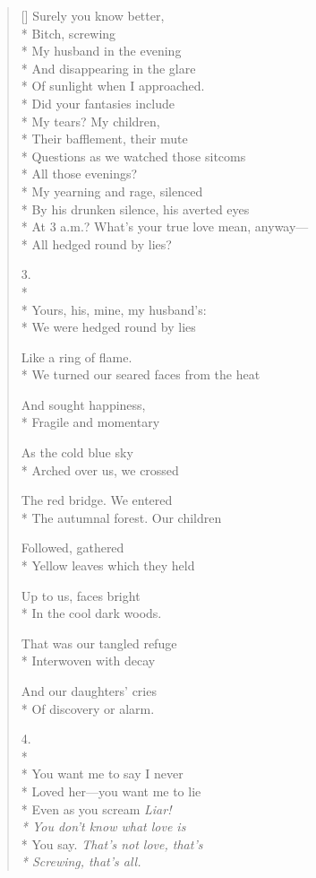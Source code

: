 \begin{verse}[\versewidth]
Surely you know better,\\*
Bitch, screwing\\*
My husband in the evening \\*
And disappearing in the glare\\*
Of sunlight when I approached. \\*
Did your fantasies include\\*
My tears?  My children, \\*
Their bafflement, their mute\\*
Questions as we watched those sitcoms\\*
All those evenings?\\*
My yearning and rage, silenced\\*
By his drunken silence, his averted eyes\\*
At 3 a.m.? What's your true love mean, anyway---\\*
All hedged round by lies?

3.\\*
~\\*
Yours, his, mine, my husband's:\\*
We were hedged round by lies

Like a ring of flame.\\*
We turned our seared faces from the heat

And sought happiness, \\*
Fragile and momentary

As the cold blue sky\\*
Arched over us, we crossed

The red bridge. We entered\\*
The autumnal forest. Our children

Followed, gathered\\*
Yellow leaves which they held

Up to us, faces bright\\*
In the cool dark woods.

That was our tangled refuge\\*
Interwoven with decay

And our daughters' cries\\*
Of discovery or alarm.

4.\\*
~\\*
You want me to say I never \\*
Loved her---you want me to lie\\*
Even as you scream \textit{Liar!\\*
You don't know what love is}\\*
You say. \textit{That's not love, that's\\*
Screwing, that's all.}


\end{verse}
